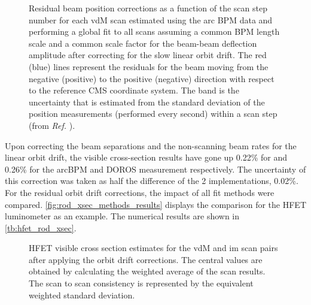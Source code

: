 \begin{itemize}
	\begin{figure}[!htb]
		\centering
		\caption[Residual beam position corrections]{Residual beam position corrections as a function of the scan step number for each vdM scan estimated using the arc BPM data and performing a global fit to all scans assuming a common BPM length scale and a common scale factor for the beam-beam deflection amplitude after correcting for the slow linear orbit drift. The red (blue) lines represent the residuals for the beam moving from the negative (positive) to the positive (negative) direction with respect to the reference CMS coordinate system. The band is the uncertainty that is estimated from the standard deviation of the position measurements (performed every second) within a scan step (from \textit{Ref.} \cite{CMS-DP-2024-068}).}
		\label{fig:dps_residual_orbit_drifts}
	\end{figure}
\end{itemize}

Upon correcting the beam separations and the non-scanning beam rates for the linear orbit drift, the visible cross-section results have gone up 0.22\% for and 0.26\% for the arcBPM and DOROS measurement respectively. The uncertainty of this correction was taken as half the difference of the 2 implementations, 0.02\%. For the residual orbit drift corrections, the impact of all fit methods were compared. \autoref{fig:rod_xsec_methods_results} displays the comparison for the HFET luminometer as an example. The numerical results are shown in \autoref{tb:hfet_rod_xsec}.

\begin{figure}[!htb]
	\centering
	\caption[Comparison of residual orbit fit methods]{HFET visible cross section estimates for the vdM and im scan pairs after applying the orbit drift corrections. The central values are obtained by calculating the weighted average of the scan results. The scan to scan consistency is represented by the equivalent weighted standard deviation.}
	\label{fig:rod_xsec_methods_results}
\end{figure}

